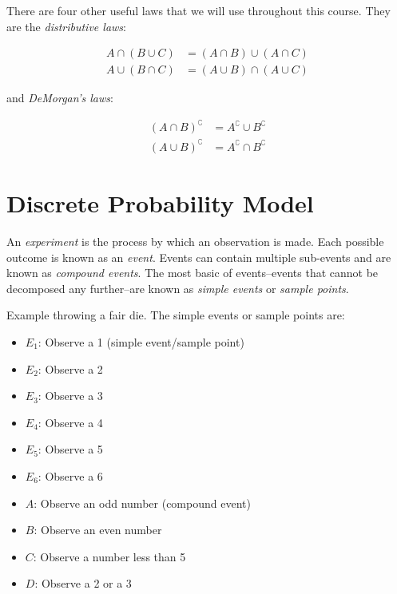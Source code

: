 \documentclass[11pt]{article}
\theoremstyle{definition}
\begin{document}
There are four other useful laws that we will use throughout this course. They are the \textit{distributive laws}:

$$
\begin{aligned}
	A \cap (B \cup C) & = (A \cap B) \cup (A \cap C) \\
	A \cup (B \cap C) & = (A \cup B) \cap (A \cup C)
\end{aligned}
$$

\noindent and \textit{DeMorgan's laws}:

$$
\begin{aligned}
	(A \cap B)^\complement & = A^\complement \cup B^\complement \\
	(A \cup B)^\complement & = A^\complement \cap B^\complement
\end{aligned}
$$

\section{Discrete Probability Model}

\begin{shaded}
	An \textit{experiment} is the process by which an observation is made. Each possible outcome is known as an \textit{event}. Events can contain multiple sub-events and are known as \textit{compound events}. The most basic of events--events that cannot be decomposed any further--are known as \textit{simple events} or \textit{sample points}.
\end{shaded}

Example throwing a fair die. The simple events or sample points are:

\begin{itemize}[label={}]
	\setlength\itemsep{0em}
	\item $E_1$: Observe a 1 (simple event/sample point)
	\item $E_2$: Observe a 2
	\item $E_3$: Observe a 3
	\item $E_4$: Observe a 4
	\item $E_5$: Observe a 5
	\item $E_6$: Observe a 6
	\item $A$: Observe an odd number (compound event)
	\item $B$: Observe an even number
	\item $C$: Observe a number less than 5
	\item $D$: Observe a 2 or a 3
\end{itemize}
\end{document}
